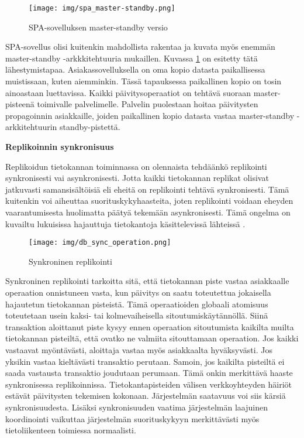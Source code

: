 \documentclass[finnish,twoside,censored,csm,sw-track-2018]{HYthesisML}
\begin{document}
\begin{figure}[ht]
  \centering
    \texttt{[image: img/spa\_master-standby.png]}
  \caption{SPA-sovelluksen master-standby versio}
  \label{fig-spa-is-master-standby}
\end{figure}

SPA-sovellus olisi kuitenkin mahdollista rakentaa ja kuvata myös enemmän master-standby -arkkkitehtuuria mukaillen. Kuvassa \ref{fig-spa-is-master-standby} on esitetty tätä lähestymistapaa. Asiakassovelluksella on oma kopio datasta paikallisessa muistissaan, kuten aiemminkin. Tässä tapauksessa paikallinen kopio on tosin ainoastaan luettavissa. Kaikki päivitysoperaatiot on tehtävä suoraan master-pisteenä toimivalle palvelimelle. Palvelin puolestaan hoitaa päivitysten propagoinnin asiakkaille, joiden paikallinen kopio datasta vastaa master-standby -arkkitehtuurin standby-pistettä.

\textbf{Replikoinnin synkronisuus}

Replikoidun tietokannan toiminnassa on olennaista tehdäänkö replikointi synkronisesti vai asynkronisesti. Jotta kaikki tietokannan replikat olisivat jatkuvasti samansisältöisiä eli eheitä on replikointi tehtävä synkronisesti. Tämä kuitenkin voi aiheuttaa suorituskykyhaasteita, joten replikointi voidaan eheyden vaarantumisesta huolimatta päätyä tekemään asynkronisesti. Tämä ongelma on kuvailtu lukuisissa hajauttuja tietokantoja käsittelevissä lähteissä \citep{gray-replication, Tanenbaum, DSAA, DSC, Kleppmann}.

\begin{figure}[ht]
  \centering
    \texttt{[image: img/db\_sync\_operation.png]}
  \caption{Synkroninen replikointi}
  \label{fig-sync-replikointi}
\end{figure}

Synkroninen replikointi tarkoitta sitä, että tietokannan piste vastaa asiakkaalle operaation onnistuneen vasta, kun päivitys on saatu toteutettua jokaisella hajautetun tietokannan pisteistä. Tämä operaatioiden globaali atomisuus toteutetaan usein kaksi- tai kolmevaiheisella sitoutumiskäytännöllä. Siinä transaktion aloittanut piste kysyy ennen operaation sitoutumista kaikilta muilta tietokannan pisteiltä, että ovatko ne valmiita sitouttamaan operaation. Jos kaikki vastaavat myöntävästi, aloittaja vastaa myös asiakkaalta hyväksyvästi. Jos yksikin vastaa kieltävästi transaktio perutaan. Samoin, jos kaikilta pisteiltä ei saada vastausta transaktio joudutaan perumaan. Tämä onkin merkittävä haaste synkronisessa replikoinnissa. Tietokantapisteiden välisen verkkoyhteyden häiriöt estävät päivitysten tekemisen kokonaan. Järjestelmän saatavuus voi siis kärsiä synkronisuudesta. Lisäksi synkronisuuden vaatima järjestelmän laajuinen koordinointi vaikuttaa järjestelmän suorituskykyyn merkittävästi myös tietoliikenteen toimiessa normaalisti.
\end{document}

